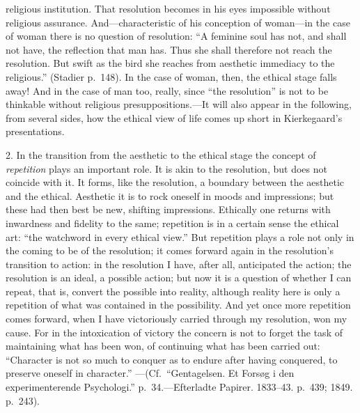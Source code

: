 \documentclass[12pt,a4paper]{book}
\newcommand{\opage}[1]{\marginnote{\footnotesize\textit{[#1]}}}
\begin{document}
religious institution. That resolution becomes in his eyes impossible
without religious assurance. And---characteristic of his conception of
woman---in the case of woman there is no question of resolution: ``A
feminine soul has not, and shall not have, the reflection that man has.
Thus she shall therefore not reach the resolution. But swift as the bird
she reaches from aesthetic immediacy to the religious.''
(Stadier p.~148). In the case of woman, then, the ethical stage falls away!
And in the case of man too, really, since ``the resolution'' is not to be
thinkable without religious presuppositions.---It will also appear in the
following, from several sides, how the ethical view of life comes up short
in Kierkegaard's presentations.

2. In the transition from the aesthetic to the ethical stage the concept
of \textit{repetition} plays an important role. It is akin to the
resolution, but does not
\opage{95}coincide with it. It forms, like the resolution, a boundary
between the aesthetic and the ethical. Aesthetic it is to rock oneself in
moods and impressions; but these had then best be new, shifting
impressions. Ethically one returns with inwardness and fidelity to the
same; repetition is in a certain sense the ethical art: ``the watchword in
every ethical view.'' But repetition plays a role not only in the coming
to be of the resolution; it comes forward again in the resolution's
transition to action: in the resolution I have, after all, anticipated the
action; the resolution is an ideal, a possible action; but now it is a
question of whether I can repeat, that is, convert the possible into
reality, although reality here is only a repetition of what was contained
in the possibility. And yet once more repetition comes forward, when I
have victoriously carried through my resolution, won my cause. For in the
intoxication of victory the concern is not to forget the task of
maintaining what has been won, of continuing what has been carried out:
``Character is not so much to conquer as to endure after having
conquered, to preserve oneself in character.''
---(Cf.\ ``Gentagelsen. Et Forsøg i den experimenterende Psychologi.''
p.~34.---Efterladte Papirer. 1833--43. p.~439; 1849. p.~243).
\end{document}
